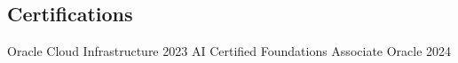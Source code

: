\documentclass[]{awesome-cv}
\begin{document}
\vspace{-6mm}
\subsection*{Certifications}
\begin{cventries}
	\vspace{-1mm}
	\cventry
	{}
	{Oracle Cloud Infrastructure 2023 AI Certified Foundations Associate \vspace{-5mm}}
	{Oracle \vspace{-5mm}}
	{2024 \vspace{-5mm}}
	{}
\end{cventries}
\end{document}
